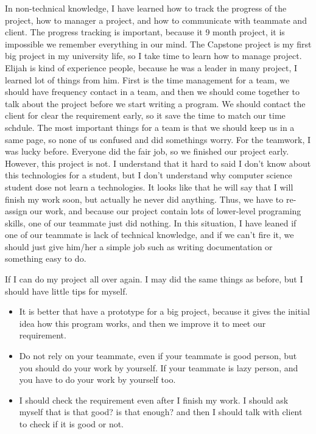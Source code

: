 In non-technical knowledge, I have learned how to track the progress of the project, how to manager a project, and how to communicate with teammate and client. 
The progress tracking is important, because it 9 month project, it is impossible we remember everything in our mind.
The Capstone project is my first big project in my university life, so I take time to learn how to manage project. 
Elijah is kind of experience people, because he was a leader in many project, I learned lot of things from him.
First is the time management for a team, we should have frequency contact in a team, and then we should come together to talk about the project before we start writing a program.
We should contact the client for clear the requirement early, so it save the time to match our time schdule.
The most important things for a team is that we should keep us in a same page, so none of us confused and did somethings worry.
For the teamwork, I was lucky before. Everyone did the fair job, so we finished our project early.
However, this project is not. 
I understand that it hard to said I don't know about this technologies for a student, but I don't understand why computer science student dose not learn a technologies.
It looks like that he will say that I will finish my work soon, but actually he never did anything.
Thus, we have to re-assign our work, and because our project contain lots of lower-level programing skills, one of our teammate just did nothing.
In this situation, I have leaned if one of our teammate is lack of technical knowledge, and if we can't fire it, we should just give him/her a simple job such as writing documentation or something easy to do.


If I can do my project all over again. I may did the same things as before, but I should have little tips for myself.
\begin{itemize}
	\item It is better that have a prototype for a big project, because it gives the initial idea how this program works, and then we improve it to meet our requirement.
	\item Do not rely on your teammate, even if your teammate is good person, but you should do your work by yourself. If your teammate is lazy person, and you have to do your work by yourself too.
	\item I should check the requirement even after I finish my work. I should ask myself that is that good? is that enough? and then I should talk with client to check if it is good or not.
\end{itemize}